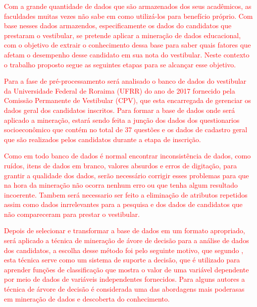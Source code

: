 \label{chapter:metodo}

\par
\textcolor{red}{Com a grande quantidade de dados que são armazenados dos seus acadêmicos, as faculdades muitas vezes não sabe em como utilizá-los para benefício próprio. Com base nesses dados armazendos, especificamente os dados do candidatos que prestaram o vestibular, se pretende aplicar a mineração de dados educacional, com o objetivo de extrair o conhecimento dessa base para saber quais fatores que afetam o desempenho desse candidato em sua nota do vestibular. Neste contexto o trabalho proposto segue as seguintes etapas para se alcançar esse objetivo.}

\par
\textcolor{red}{Para a fase de pré-processamento será analisado o banco de dados do vestibular da Universidade Federal de Roraima (UFRR) do ano de 2017 fornecido pela Comissão Permanente de Vestibular (CPV), que esta encarregada de gerenciar os dados geral dos candidatos inscritos. Para formar a base de dados onde será aplicado a mineração, estará sendo feita a junção dos dados dos questionarios socioeconômico que contém no total de 37 questões e os dados de cadastro geral que são realizados pelos candidatos durante a etapa de inscrição.}


\par
\textcolor{red}{Como em todo banco de dados é normal encontrar inconsistência de dados, como ruídos, itens de dados em branco, valores absurdos e erros de digitação, para grantir a qualidade dos dados, serão necessário corrigir esses problemas para que na hora da mineração não ocorra nenhum erro ou que tenha algum resultado incoerente. Tambem será necessario ser feito a eliminação de atributos repetidos assim como dados inrrelevantes para a pesquisa e dos dados de candidatos que não compareceram para prestar o vestibular.}

\par
\textcolor{red}{Depois de selecionar e transformar a base de dados em um formato apropriado, será aplicado a técnica de mineração de ávore de decisão para a análise de dados dos candidatos, a escolha desse método foi pelo seguinte motivo, que segundo , esta técnica serve como um sistema de suporte a decisão, que é utilizado para aprender funções de classificação que mostra o valor de uma variável dependente por meio de dados de variáveis independentes fornecidos. Para alguns autores a técnica de árvore de decisão é considerada uma das abordagens mais poderasas em mineração de dados e descoberta do conhecimento.}

